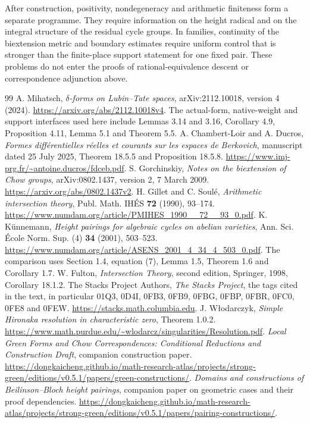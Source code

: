 \documentclass[11pt,a4paper]{article}
\theoremstyle{definition}
\theoremstyle{remark}
\numberwithin{equation}{section}
\begin{document}
After construction, positivity, nondegeneracy and arithmetic finiteness form a separate programme. They require information on the height radical and on the integral structure of the residual cycle groups. In families, continuity of the biextension metric and boundary estimates require uniform control that is stronger than the finite-place support statement for one fixed pair. These problems do not enter the proofs of rational-equivalence descent or correspondence adjunction above.


\begin{thebibliography}{99}
 A. Mihatsch, \emph{$\delta$-forms on Lubin--Tate spaces}, arXiv:2112.10018, version 4 (2024). \url{https://arxiv.org/abs/2112.10018v4}. The actual-form, native-weight and support interfaces used here include Lemmas 3.14 and 3.16, Corollary 4.9, Proposition 4.11, Lemma 5.1 and Theorem 5.5.
 A. Chambert-Loir and A. Ducros, \emph{Formes diff\'erentielles r\'eelles et courants sur les espaces de Berkovich}, manuscript dated 25 July 2025, Theorem 18.5.5 and Proposition 18.5.8. \url{https://www.imj-prg.fr/~antoine.ducros/fdceb.pdf}.
 S. Gorchinskiy, \emph{Notes on the biextension of Chow groups}, arXiv:0802.1437, version 2, 7 March 2009. \url{https://arxiv.org/abs/0802.1437v2}.
 H. Gillet and C. Soul\'e, \emph{Arithmetic intersection theory}, Publ. Math. IH\'ES \textbf{72} (1990), 93--174. \url{https://www.numdam.org/article/PMIHES_1990__72__93_0.pdf}.
 K. K\"unnemann, \emph{Height pairings for algebraic cycles on abelian varieties}, Ann. Sci. \'Ecole Norm. Sup. (4) \textbf{34} (2001), 503--523. \url{https://www.numdam.org/article/ASENS_2001_4_34_4_503_0.pdf}. The comparison uses Section 1.4, equation (7), Lemma 1.5, Theorem 1.6 and Corollary 1.7.
 W. Fulton, \emph{Intersection Theory}, second edition, Springer, 1998, Corollary 18.1.2.
 The Stacks Project Authors, \emph{The Stacks Project}, the tags cited in the text, in particular 01Q3, 0D4I, 0FB3, 0FB9, 0FBG, 0FBP, 0FBR, 0FC0, 0FE8 and 0FEW. \url{https://stacks.math.columbia.edu}.
 J. W\l odarczyk, \emph{Simple Hironaka resolution in characteristic zero}, Theorem 1.0.2. \url{https://www.math.purdue.edu/~wlodarcz/singularities/Resolution.pdf}.
 \emph{Local Green Forms and Chow Correspondences: Conditional Reductions and Construction Draft}, companion construction paper. \url{https://dongkaicheng.github.io/math-research-atlas/projects/strong-green/editions/v0.5.1/papers/green-constructions/}.
 \emph{Domains and constructions of Beilinson--Bloch height pairings}, companion paper on geometric cases and their proof dependencies. \url{https://dongkaicheng.github.io/math-research-atlas/projects/strong-green/editions/v0.5.1/papers/pairing-constructions/}.
\end{thebibliography}
\end{document}
